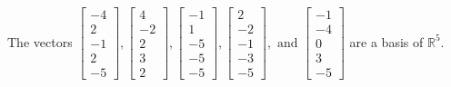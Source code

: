 \begin{exercise}
\begin{exerciseStatement}
  \end{exerciseStatement}
  \begin{exerciseAnswer}
   The vectors \(\left[\begin{array}{r}
-4 \\
2 \\
-1 \\
2 \\
-5
\end{array}\right] , \left[\begin{array}{r}
4 \\
-2 \\
2 \\
3 \\
2
\end{array}\right] , \left[\begin{array}{r}
-1 \\
1 \\
-5 \\
-5 \\
-5
\end{array}\right] , \left[\begin{array}{r}
2 \\
-2 \\
-1 \\
-3 \\
-5
\end{array}\right] , \text{ and } \left[\begin{array}{r}
-1 \\
-4 \\
0 \\
3 \\
-5
\end{array}\right]\) 
  	 are  a basis of \(\mathbb{R}^5\).
  


  \end{exerciseAnswer}
\end{exercise}